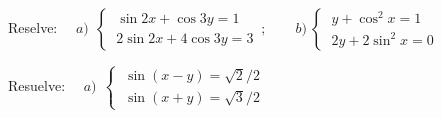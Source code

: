 \begin{mipropuesto}

Reselve: $\quad a)\ \ \begin{cases} \ \sin 2 x + \cos 3 y=1 \\ \ 2\sin 2x + 4 \cos 3y=3 \end{cases}\, ; \qquad b)\ \begin{cases} \ y+\cos^2 x=1 \\ \ 2y+2\sin^2 x=0 \end{cases}$

\end{mipropuesto}

\vspace{-8mm}
\begin{flushright}
\begin{footnotesize} \textcolor{gris}{}	\end{footnotesize}
\end{flushright}
\vspace{-11mm}
\begin{flushright}
\begin{footnotesize} \textcolor{gris}{}	\end{footnotesize}
\end{flushright}
\vspace{-11mm}
\begin{flushright}
\begin{footnotesize} \textcolor{gris}{}	\end{footnotesize}
\end{flushright}


\begin{mipropuesto}

Resuelve: $\quad a)\ \ \begin{cases} \ \sin(x-y)=\sqrt{2}/2 \\ \ \sin(x+y)=\sqrt{3}/ 2 \end{cases}$ 

\end{mipropuesto}

\vspace{-8mm}
\begin{flushright}
\begin{tiny} \textcolor{gris}{}	\end{tiny}
\end{flushright}







